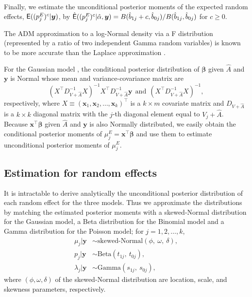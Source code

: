 \documentclass[article]{jss}
\begin{document}
Finally, we estimate the unconditional posterior moments of the expected random effects, $\mathsf{E}((p^E_{j})^c\vert\boldsymbol{y})$, by $\hat{\mathsf{E}}((p^E_{j})^c\vert\hat{\alpha}, \boldsymbol{y})=B(\hat{b}_{1j} + c, \hat{b}_{0j})/B(\hat{b}_{1j}, \hat{b}_{0j})$ for $c\ge0$.

The ADM approximation to a log-Normal density via a F distribution (represented by a ratio of two independent Gamma random variables) is known to be more accurate than the Laplace approximation \citep{carl1988}.


For the Gaussian model \citep{tang2011}, the conditional posterior distribution of $\boldsymbol{\beta}$ given $\hat{A}$ and $\boldsymbol{y}$ is Normal whose mean and variance-covariance matrix are
\begin{equation}
(X^\top D^{-1}_{V+\hat{A}} X)^{-1}X^\top D^{-1}_{V+\hat{A}}\boldsymbol{y}~~ \textrm{and}~~ (X^\top D^{-1}_{V+\hat{A}} X)^{-1},
\end{equation}
respectively, where $X\equiv (\boldsymbol{x}_1, \boldsymbol{x}_2, \ldots, \boldsymbol{x}_k)^\top$ is a $k \times m$ covariate matrix and $D_{V+\hat{A}}$ is a $k \times k$ diagonal matrix with the $j$-th diagonal element equal to $V_j+\hat{A}$. Because $\boldsymbol{x}^\top\boldsymbol{\beta}$ given $\hat{A}$ and $\boldsymbol{y}$ is also Normally distributed, we easily obtain the conditional posterior moments of $\mu^E_j=\boldsymbol{x}^\top\boldsymbol{\beta}$ and use them to estimate unconditional posterior moments of $\mu^E_j$.


\subsection{Estimation for random effects}
It is intractable to derive analytically the unconditional posterior
distribution of each random effect for the three models. Thus we approximate the
distributions by matching the estimated posterior moments with a skewed-Normal distribution \citep{azzalini1985class} for
the Gaussian model, a Beta distribution for the Binomial model and a Gamma distribution for the Poisson model; for $j=1, 2, \ldots, k$,
\begin{align}
\mu_j\vert\boldsymbol{y} &\sim \textrm{skewed-Normal}(\phi,~ \omega,~ \delta),\label{skewnormal}\\
p_j\vert \boldsymbol{y} &\sim \textrm{Beta}(t_{1j},~ t_{0j}),\label{betapost}\\
\lambda_j\vert \boldsymbol{y} &\sim \textrm{Gamma}(s_{1j},~ s_{0j}),\label{gammapost}
\end{align}
where $(\phi, \omega, \delta)$ of the skewed-Normal distribution  are location,  scale, and skewness parameters, respectively.
\end{document}
